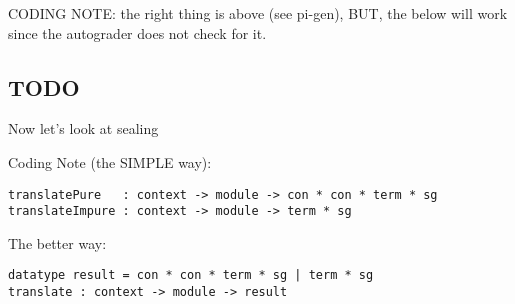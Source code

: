 \begin{mathpar}
\end{mathpar}

\vspace{1cm}
CODING NOTE: the right thing is above (see pi-gen), BUT, the below
will work since the autograder does not check for it.
\begin{mathpar}
\end{mathpar}


\subsection{TODO}
Now let's look at sealing
\begin{mathpar}

\end{mathpar}

Coding Note (the SIMPLE way):
\begin{lstlisting}
translatePure   : context -> module -> con * con * term * sg
translateImpure : context -> module -> term * sg
\end{lstlisting}
The better way:
\begin{lstlisting}
datatype result = con * con * term * sg | term * sg
translate : context -> module -> result
\end{lstlisting}
